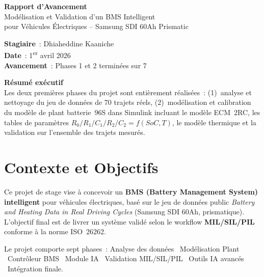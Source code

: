 \documentclass[a4paper,11pt]{article}
\begin{document}
\begin{titlepage}
\centering
\vspace*{1.5cm}
{\LARGE\bfseries\textcolor{bmsprimary}{Rapport d'Avancement}}\\[0.4cm]
{\Large\textcolor{bmssecondary}{Modélisation et Validation d'un BMS Intelligent}}\\[0.3cm]
{\large\textcolor{bmssecondary}{pour Véhicules Électriques -- Samsung SDI 60Ah Prismatic}}\\[1.5cm]

\begin{tcolorbox}[colback=bmslight, colframe=bmsprimary, width=13cm]
\centering
\textbf{Stagiaire}~: Dhiaheddine Kaaniche\\[4pt]
\textbf{Date}~: 1\textsuperscript{er} avril 2026\\[4pt]
\textbf{Avancement}~: Phases 1 et 2 terminées sur 7
\end{tcolorbox}

\vfill
\begin{tcolorbox}[colback=bmsgreen!8, colframe=bmsgreen, width=13cm]
\centering
\textbf{Résumé exécutif}\\[4pt]
Les deux premières phases du projet sont entièrement réalisées~:
(1)~analyse et nettoyage du jeu de données de 70 trajets réels,
(2)~modélisation et calibration du modèle de plant batterie~96S dans
Simulink incluant le modèle ECM~2RC, les tables de paramètres
$R_0/R_1/C_1/R_2/C_2 = f(SoC, T)$, le modèle thermique et la
validation sur l'ensemble des trajets mesurés.
\end{tcolorbox}
\end{titlepage}

\tableofcontents
\newpage

\section{Contexte et Objectifs}

Ce projet de stage vise à concevoir un \textbf{BMS (Battery Management System)
intelligent} pour véhicules électriques, basé sur le jeu de données public
\textit{Battery and Heating Data in Real Driving Cycles} (Samsung SDI 60Ah,
prismatique). L'objectif final est de livrer un système validé selon le
workflow \textbf{MIL/SIL/PIL} conforme à la norme ISO~26262.

Le projet comporte sept phases~: Analyse des données \textrightarrow\
Modélisation Plant \textrightarrow\ Contrôleur BMS \textrightarrow\
Module IA \textrightarrow\ Validation MIL/SIL/PIL \textrightarrow\
Outils IA avancés \textrightarrow\ Intégration finale.
\end{document}

